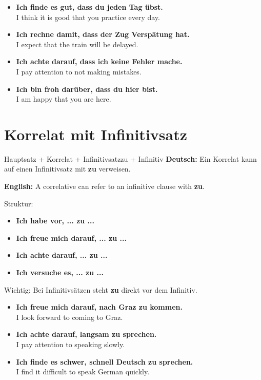 \documentclass[a4paper,11pt]{article}
\newcommand{\GermanText}[1]{\textbf{Deutsch: }#1\par}
\newcommand{\EnglishText}[1]{{\small\color{SoftGray}\textbf{English: }#1\par}}
\newcommand{\ExampleItem}[2]{\item \textbf{#1}\\{\small\color{SoftGray}#2}}
\begin{document}
        \begin{exbox}
            \begin{itemize}
                \ExampleItem{Ich finde es gut, dass du jeden Tag übst.}{I think it is good that you practice every day.}
                \ExampleItem{Ich rechne damit, dass der Zug Verspätung hat.}{I expect that the train will be delayed.}
                \ExampleItem{Ich achte darauf, dass ich keine Fehler mache.}{I pay attention to not making mistakes.}
                \ExampleItem{Ich bin froh darüber, dass du hier bist.}{I am happy that you are here.}
            \end{itemize}
        \end{exbox}
    
    
    \section{Korrelat mit Infinitivsatz}
        
        \begin{grammarentry}{Hauptsatz + Korrelat + Infinitivsatz}{zu + Infinitiv}
            \GermanText{Ein Korrelat kann auf einen Infinitivsatz mit \textbf{zu} verweisen.}
            \EnglishText{A correlative can refer to an infinitive clause with \textbf{zu}.}
            
            Struktur:
            \begin{itemize}
                \item \textbf{Ich habe vor, ... zu ...}
                \item \textbf{Ich freue mich darauf, ... zu ...}
                \item \textbf{Ich achte darauf, ... zu ...}
                \item \textbf{Ich versuche es, ... zu ...}
            \end{itemize}
            
            Wichtig: Bei Infinitivsätzen steht \textbf{zu} direkt vor dem Infinitiv.
        \end{grammarentry}
        
        \begin{exbox}
            \begin{itemize}
                \ExampleItem{Ich freue mich darauf, nach Graz zu kommen.}{I look forward to coming to Graz.}
                \ExampleItem{Ich achte darauf, langsam zu sprechen.}{I pay attention to speaking slowly.}
                \ExampleItem{Ich finde es schwer, schnell Deutsch zu sprechen.}{I find it difficult to speak German quickly.}
            \end{itemize}
        \end{exbox}
    
\end{document}
